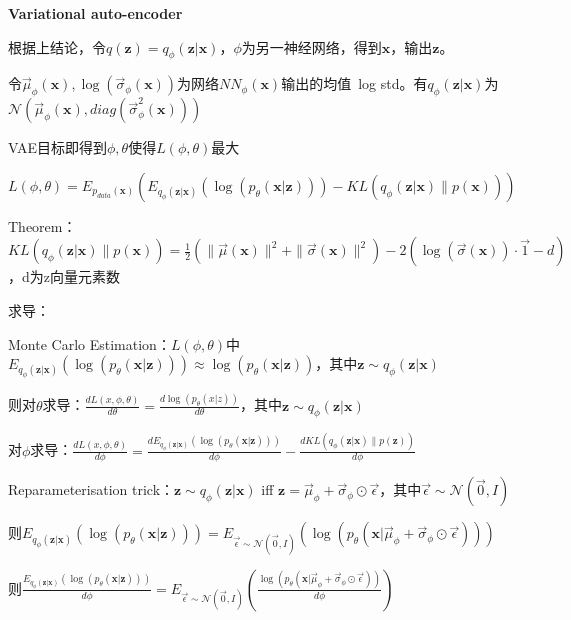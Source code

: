 \documentclass[UTF8]{ctexart}
\begin{document}
  \textbf{Variational auto-encoder}

  \quad 根据上结论，令$q(\mathbf{z}) = q_{\phi}(\mathbf{z} | \mathbf{x})$，$\phi$为另一神经网络，得到$\mathbf{x}$，输出$\mathbf{z}$。

  \quad 令$\vec{\mu}_{\phi}(\mathbf{x}), \log(\vec{\sigma}_{\phi}(\mathbf{x}))$为网络$NN_{\phi}(\mathbf{x})$输出的均值\ log std。有$q_{\phi}(\mathbf{z} | \mathbf{x})$为$\mathcal{N}(\vec{\mu}_{\phi}(\mathbf{x}), diag(\vec{\sigma}^2_{\phi}(\mathbf{x})))$

  \quad VAE目标即得到$\phi, \theta$使得$L(\phi, \theta)$最大

  \quad \quad $L(\phi, \theta) = E_{p_{data}(\mathbf{x})}(E_{q_{\phi}(\mathbf{z} | \mathbf{x})}(\log(p_{\theta}(\mathbf{x} | \mathbf{z}))) - KL(q_{\phi}(\mathbf{z} | \mathbf{x})\| p(\mathbf{x})))$

  \quad Theorem：$KL(q_{\phi}(\mathbf{z} | \mathbf{x})\| p(\mathbf{x})) = \frac{1}{2}(\|\vec{\mu}(\mathbf{x})\|^2 + \|\vec{\sigma}(\mathbf{x})\|^2) - 2(\log(\vec{\sigma}(\mathbf{x})) \cdot \vec{1} - d)$，d为z向量元素数

  求导：

  \quad Monte Carlo Estimation：$L(\phi, \theta)$中$E_{q_{\phi}(\mathbf{z} | \mathbf{x})}(\log(p_{\theta}(\mathbf{x} | \mathbf{z}))) \approx \log(p_{\theta}(\mathbf{x} | \mathbf{z}))$，其中$\mathbf{z} \sim q_{\phi}(\mathbf{z} | \mathbf{x})$

  \quad 则对$\theta$求导：$\frac{dL(x, \phi, \theta)}{d\theta} = \frac{d \log(p_{\theta}(x | z))}{d \theta}$，其中$\mathbf{z} \sim q_{\phi}(\mathbf{z} | \mathbf{x})$
  
  \quad 对$\phi$求导：$\frac{dL(x, \phi, \theta)}{d \phi} = \frac{d E_{q_{\phi}(\mathbf{z} | \mathbf{x})}(\log(p_{\theta}(\mathbf{x} | \mathbf{z})))}{d\phi} - \frac{d KL(q_{\phi}(\mathbf{z} | \mathbf{x}) \| p(\mathbf{z}))}{d\phi}$

  \quad \quad Reparameterisation trick：$\mathbf{z} \sim q_{\phi}(\mathbf{z} | \mathbf{x})$ iff $\mathbf{z} = \vec{\mu}_{\phi} + \vec{\sigma}_{\phi} \odot \vec{\epsilon}$，其中$\vec{\epsilon} \sim \mathcal{N}(\vec{0}, I)$

  \quad \quad 则$E_{q_{\phi}(\mathbf{z} | \mathbf{x})}(\log(p_{\theta}(\mathbf{x} | \mathbf{z}))) = E_{\vec{\epsilon} \sim \mathcal{N}(\vec{0}, I)}(\log(p_{\theta}(\mathbf{x} | \vec{\mu}_{\phi} + \vec{\sigma}_{\phi} \odot \vec{\epsilon})))$
  
  \quad \quad 则$\frac{E_{q_{\phi}(\mathbf{z} | \mathbf{x})}(\log(p_{\theta}(\mathbf{x} | \mathbf{z})))}{d \phi} = E_{\vec{\epsilon} \sim \mathcal{N}(\vec{0}, I)}(\frac{\log(p_{\theta}(\mathbf{x} | \vec{\mu}_{\phi} + \vec{\sigma}_{\phi} \odot \vec{\epsilon}))}{d\phi})$
\end{document}
